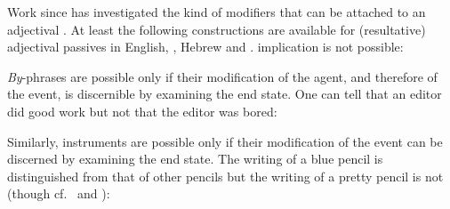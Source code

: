 \begin{exe}
\begin{xlist}
\begin{exe}
\begin{xlist}
\begin{exe}
\begin{exe}
\begin{xlist}
\begin{exe}
\begin{exe}
\begin{xlist}
\begin{exe}
\begin{xlist}
\begin{exe}
\begin{xlist}
\begin{exe}
\begin{xlist}
\begin{exe}
\begin{xlist}
\begin{xlist}
\begin{exe}
\begin{xlist}
Work since has investigated the kind of modifiers that can be attached to an adjectival  \citep{meltzerasscher11,mcintyre13,alexiadouetal14,bruening14nllt,gehrkemarco14}. At least the following constructions are available for (resultative) adjectival passives in English, , Hebrew and .  implication is not possible:
 \begin{exe}
 \ex  
 \begin{xlist} 
 \z
\z 

\emph{By}-phrases are possible only if their modification of the agent, and therefore of the event, is discernible by examining the end state. One can tell that an editor did good work but not that the editor was bored:
 \begin{exe}
	
 \z 

Similarly, instruments are possible only if their modification of the event can be discerned by examining the end state. The writing of a blue pencil is distinguished from that of other pencils but the writing of a pretty pencil is not (though cf.~\citealt{mcintyre13} and \citealt{bruening14nllt}):
 \begin{exe}
	
 \z 


\end{exe}
\end{exe}
\end{xlist}
\end{exe}
\end{xlist}
\end{exe}
\end{xlist}
\end{xlist}
\end{exe}
\end{xlist}
\end{exe}
\end{xlist}
\end{exe}
\end{xlist}
\end{exe}
\end{xlist}
\end{exe}
\end{exe}
\end{xlist}
\end{exe}
\end{exe}
\end{xlist}
\end{exe}
\end{xlist}
\end{exe}
